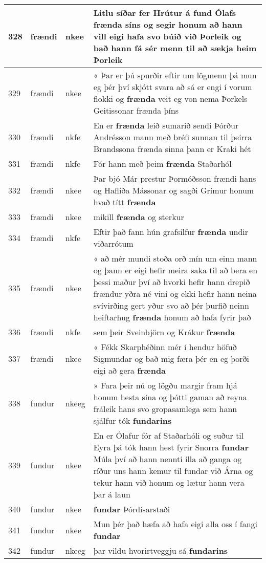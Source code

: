 \documentclass{article}
\begin{document}
\begin{longtable}{p{1cm}|p{1cm}|p{1cm}|p{13cm}}
\hline
328&frændi&nkee&Litlu síðar fer Hrútur á fund Ólafs \textbf{frænda} síns og segir honum að hann vill eigi hafa svo búið við Þorleik og bað hann fá sér menn til að sækja heim Þorleik\\
\hline
329&frændi&nkee&« Þar er þú spurðir eftir um lögmenn þá mun eg þér því skjótt svara að sá er engi í vorum flokki og \textbf{frænda} veit eg von nema Þorkels Geitissonar frænda þíns\\
\hline
330&frændi&nkfe&En er \textbf{frænda} leið sumarið sendi Þórður Andrésson mann með bréfi sunnan til þeirra Brandssona frænda sinna þann er Kraki hét\\
\hline
331&frændi&nkfe&Fór hann með þeim \textbf{frænda} Staðarhól\\
\hline
332&frændi&nkee&Þar bjó Már prestur Þormóðsson frændi hans og Hafliða Mássonar og sagði Grímur honum hvað títt \textbf{frænda} \\
\hline
333&frændi&nkee&mikill \textbf{frænda} og sterkur\\
\hline
334&frændi&nkfe&Eftir það fann hún grafsilfur \textbf{frænda} undir viðarrótum\\
\hline
335&frændi&nkee&« að mér mundi stoða orð mín um einn mann og þann er eigi hefir meira saka til að bera en þessi maður því að hvorki hefir hann drepið frændur yðra né vini og ekki hefir hann neina svívirðing gert yður svo að þér þurfið neinn heiftarhug \textbf{frænda} honum að hafa fyrir það\\
\hline
336&frændi&nkfe&sem þeir Sveinbjörn og Krákur \textbf{frænda} \\
\hline
337&frændi&nkee&« Fékk Skarphéðinn mér í hendur höfuð Sigmundar og bað mig færa þér en eg þorði eigi að gera \textbf{frænda} \\
\hline
338&fundur&nkeeg&» Fara þeir nú og lögðu margir fram hjá honum hesta sína og þótti gaman að reyna fráleik hans svo gropasamlega sem hann sjálfur tók \textbf{fundarins} \\
\hline
339&fundur&nkee&En er Ólafur fór af Staðarhóli og suður til Eyra þá tók hann hest fyrir Snorra \textbf{fundar} Múla því að hann nennti illa að ganga og ríður uns hann kemur til fundar við Árna og tekur hann við honum og lætur hann vera þar á laun\\
\hline
340&fundur&nkee& \textbf{fundar} Þórdísarstaði\\
\hline
341&fundur&nkee&Mun þér það hæfa að hafa eigi alla oss í fangi \textbf{fundar} \\
\hline
342&fundur&nkeeg&þar vildu hvorirtveggju sá \textbf{fundarins} \\

\end{longtable}
\end{document}

